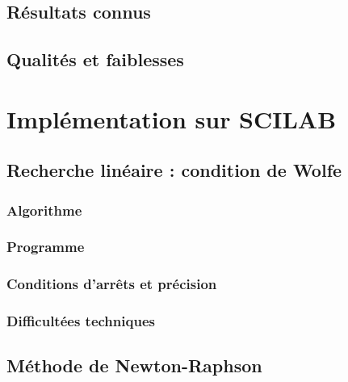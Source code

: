 \documentclass[3p, twocolumn]{elsarticle}
\begin{document}
\subsection{Résultats connus}
\subsection{Qualités et faiblesses}

\section{Implémentation sur SCILAB}
\subsection{Recherche linéaire : condition de Wolfe}
\subsubsection{Algorithme}
\subsubsection{Programme}
\subsubsection{Conditions d'arrêts et précision}
\subsubsection{Difficultées techniques}
\subsection{Méthode de Newton-Raphson}
\end{document}
